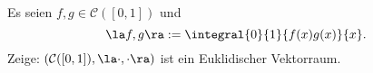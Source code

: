 \begin{prob}
Es seien $f,g\in\mathcal{C}([0,1])$ und
$$\la f,g\ra:=\integral{0}{1}{f(x)g(x)}{x}.$$
Zeige: $(\mathcal{C}([0,1]),\la\cdot,\cdot\ra)$ ist ein Euklidischer Vektorraum.
\end{prob}
